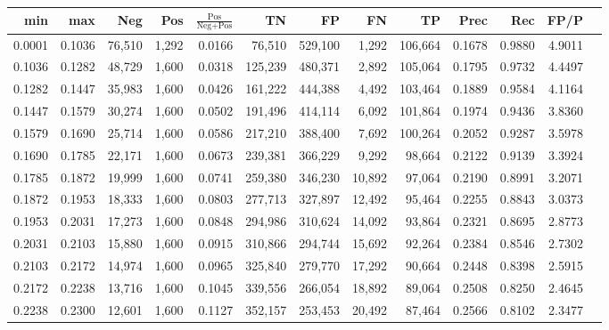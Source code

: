 \begin{tabular}{rrrrrrrrrrrrr}
\toprule
   min &    max &    Neg &   Pos & $\frac{\text{Pos}}{\text{Neg}+\text{Pos}}$ &      TN &      FP &      FN &      TP &   Prec &    Rec &   FP/P \\
\midrule
0.0001 & 0.1036 & 76,510 & 1,292 &                                     0.0166 &  76,510 & 529,100 &   1,292 & 106,664 & 0.1678 & 0.9880 & 4.9011 \\
0.1036 & 0.1282 & 48,729 & 1,600 &                                     0.0318 & 125,239 & 480,371 &   2,892 & 105,064 & 0.1795 & 0.9732 & 4.4497 \\
0.1282 & 0.1447 & 35,983 & 1,600 &                                     0.0426 & 161,222 & 444,388 &   4,492 & 103,464 & 0.1889 & 0.9584 & 4.1164 \\
0.1447 & 0.1579 & 30,274 & 1,600 &                                     0.0502 & 191,496 & 414,114 &   6,092 & 101,864 & 0.1974 & 0.9436 & 3.8360 \\
0.1579 & 0.1690 & 25,714 & 1,600 &                                     0.0586 & 217,210 & 388,400 &   7,692 & 100,264 & 0.2052 & 0.9287 & 3.5978 \\
0.1690 & 0.1785 & 22,171 & 1,600 &                                     0.0673 & 239,381 & 366,229 &   9,292 &  98,664 & 0.2122 & 0.9139 & 3.3924 \\
0.1785 & 0.1872 & 19,999 & 1,600 &                                     0.0741 & 259,380 & 346,230 &  10,892 &  97,064 & 0.2190 & 0.8991 & 3.2071 \\
0.1872 & 0.1953 & 18,333 & 1,600 &                                     0.0803 & 277,713 & 327,897 &  12,492 &  95,464 & 0.2255 & 0.8843 & 3.0373 \\
0.1953 & 0.2031 & 17,273 & 1,600 &                                     0.0848 & 294,986 & 310,624 &  14,092 &  93,864 & 0.2321 & 0.8695 & 2.8773 \\
0.2031 & 0.2103 & 15,880 & 1,600 &                                     0.0915 & 310,866 & 294,744 &  15,692 &  92,264 & 0.2384 & 0.8546 & 2.7302 \\
0.2103 & 0.2172 & 14,974 & 1,600 &                                     0.0965 & 325,840 & 279,770 &  17,292 &  90,664 & 0.2448 & 0.8398 & 2.5915 \\
0.2172 & 0.2238 & 13,716 & 1,600 &                                     0.1045 & 339,556 & 266,054 &  18,892 &  89,064 & 0.2508 & 0.8250 & 2.4645 \\
0.2238 & 0.2300 & 12,601 & 1,600 &                                     0.1127 & 352,157 & 253,453 &  20,492 &  87,464 & 0.2566 & 0.8102 & 2.3477 \\

\end{tabular}
